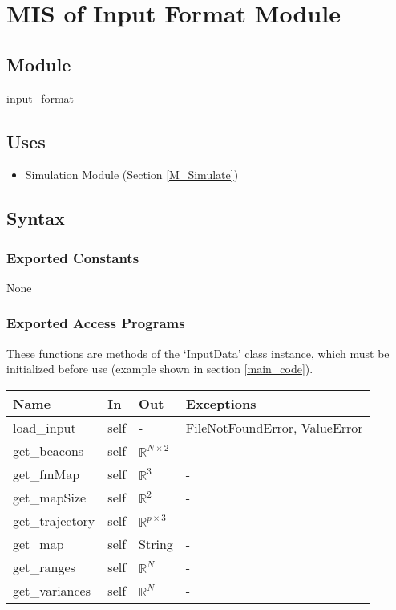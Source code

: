\documentclass[12pt, titlepage]{article}
\begin{document}
\newpage

\section{MIS of Input Format Module} \label{M_Input} 



\subsection{Module}

input\_format

\subsection{Uses}
\begin{itemize}
  \item Simulation Module (Section \ref{M_Simulate})
\end{itemize}

\subsection{Syntax}

\subsubsection{Exported Constants}
None
\subsubsection{Exported Access Programs}

These functions are methods of the `InputData' class instance, which must be initialized before use (example shown in section \ref{main_code}).

\begin{center}
\begin{tabular}{p{3cm} p{2cm} p{2cm} p{4cm}}
\hline
\textbf{Name} & \textbf{In} & \textbf{Out} & \textbf{Exceptions} \\
\hline
load\_input & self & -& FileNotFoundError, ValueError \\
get\_beacons& self & $\mathbb{R}^{N \times 2}$ & - \\
get\_fmMap& self & $\mathbb{R}^3$ & - \\
get\_mapSize& self & $\mathbb{R}^2$ & - \\
get\_trajectory& self & $\mathbb{R}^{p \times 3}$ & - \\
get\_map& self & String & - \\
get\_ranges& self & $\mathbb{R}^N$ & - \\
get\_variances& self & $\mathbb{R}^N$ & - \\
\hline
\end{tabular}
\end{center}
\end{document}
